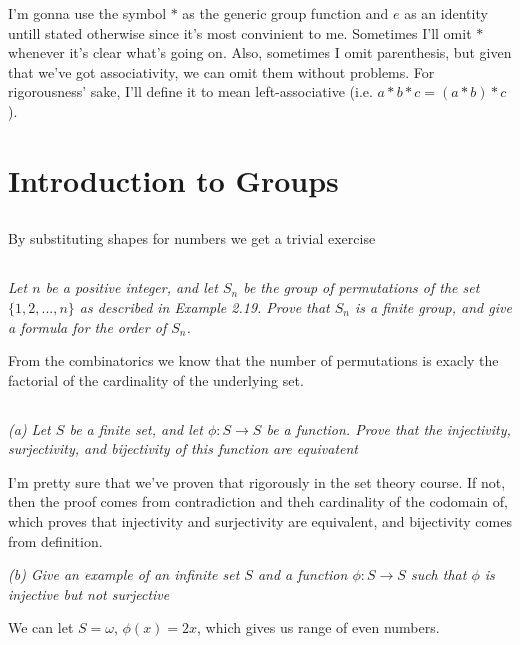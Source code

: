 \documentclass[11pt,oneside,titlepage]{book}
\newcommand{\set}[1]{\{ #1 \}}
\begin{document}
I'm gonna use the symbol $*$ as the generic group function and $e$ as
an identity untill stated otherwise since it's most convinient to me.
Sometimes I'll omit $*$ whenever it's clear what's going on. Also,
sometimes I omit parenthesis, but given that we've got associativity,
we can omit them without problems. For rigorousness' sake, I'll
define it to mean left-associative (i.e. $a * b * c = (a * b) * c$).

\section{Introduction to Groups}

\subsection{}

By substituting shapes for numbers we get a trivial exercise


\subsection{}

\textit{Let $n$ be a positive integer, and let $S_n$ be the group of
  permutations of the set $\set{1, 2, ... , n}$ as described in Example
  2.19. Prove that $S_n$ is a finite group, and give a formula for the
  order of $S_n$.}

From the combinatorics we know that the number of permutations is
exacly the factorial of the cardinality of the underlying set.

\subsection{}

\textit{(a) Let $S$ be a finite set, and let $\phi: S \to S$ be a function. Prove that the
  injectivity, surjectivity, and bijectivity of this function are equivatent}

I'm pretty sure that we've proven that rigorously in the set theory
course. If not, then the proof comes from contradiction and theh
cardinality of the codomain of, which proves that injectivity and
surjectivity are equivalent, and bijectivity comes from definition.

\textit{(b) Give an example of an infinite set $S$ and a function
  $\phi: S \to S$ such that $\phi$ is injective but not surjective}

We can let $S = \omega$, $\phi(x) = 2x$, which gives us range of even numbers.
\end{document}

